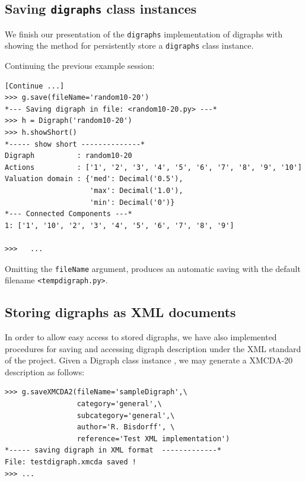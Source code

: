 \documentclass{article}
\newcommand{\+}{\verb+}
\renewcommand{\*}{\back{}}
\newcommand{\Dg}{\texttt{digraphs}\xspace }
\begin{document}
\begin{center}
\subsection{Saving \Dg class instances}

We finish our presentation of the \Dg implementation of digraphs with showing the method  for persistently store a \Dg class instance.

Continuing the previous example session:
\begin{example}
\begin{verbatim}
[Continue ...]
>>> g.save(fileName='random10-20')
*--- Saving digraph in file: <random10-20.py> ---*
>>> h = Digraph('random10-20')
>>> h.showShort()
*----- show short --------------*
Digraph          : random10-20
Actions          : ['1', '2', '3', '4', '5', '6', '7', '8', '9', '10']
Valuation domain : {'med': Decimal('0.5'), 
                    'max': Decimal('1.0'), 
                    'min': Decimal('0')}
*--- Connected Components ---*
1: ['1', '10', '2', '3', '4', '5', '6', '7', '8', '9']

>>>   ...
\end{verbatim}
\end{example}
Omitting the \+fileName+ argument, produces an automatic saving with the default filename \+<tempdigraph.py>+. 
 
\subsection{Storing digraphs as XML documents}

In order to allow easy access to stored digraphs, we have also implemented procedures for saving and accessing digraph description under the XML standard of the  project. Given a Digraph class instance , we may generate a XMCDA-20 description as follows:

\begin{example}
\begin{verbatim}
>>> g.saveXMCDA2(fileName='sampleDigraph',\
                 category='general',\
                 subcategory='general',\
                 author='R. Bisdorff', \
                 reference='Test XML implementation')
*----- saving digraph in XML format  -------------*
File: testdigraph.xmcda saved !
>>> ...
\end{verbatim}
\end{example}


\end{center}
\end{document}
